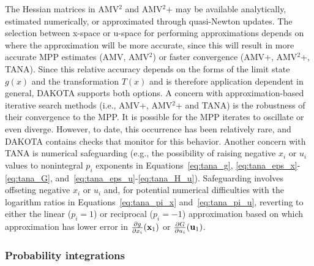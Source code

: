 The Hessian matrices in AMV$^2$ and AMV$^2$+ may be available
analytically, estimated numerically, or approximated through
quasi-Newton updates.  The selection between x-space or u-space for
performing approximations depends on where the approximation will be
more accurate, since this will result in more accurate MPP estimates
(AMV, AMV$^2$) or faster convergence (AMV+, AMV$^2$+, TANA).  Since
this relative accuracy depends on the forms of the limit state $g(x)$
and the transformation $T(x)$ and is therefore application dependent
in general, DAKOTA supports both options.  A concern with
approximation-based iterative search methods (i.e., AMV+, AMV$^2$+ and
TANA) is the robustness of their convergence to the MPP.  It is
possible for the MPP iterates to oscillate or even diverge.  However,
to date, this occurrence has been relatively rare, and DAKOTA contains
checks that monitor for this behavior.  Another concern with TANA is
numerical safeguarding (e.g., the possibility of raising negative
$x_i$ or $u_i$ values to nonintegral $p_i$ exponents in
Equations~\ref{eq:tana_g}, \ref{eq:tana_eps_x}-\ref{eq:tana_G},
and~\ref{eq:tana_eps_u}-\ref{eq:tana_H_u}).  Safeguarding involves
offseting negative $x_i$ or $u_i$ and, for potential numerical
difficulties with the logarithm ratios in Equations~\ref{eq:tana_pi_x}
and~\ref{eq:tana_pi_u}, reverting to either the linear ($p_i = 1$) or
reciprocal ($p_i = -1$) approximation based on which approximation has
lower error in $\frac{\partial g}{\partial x_i}({\bf x}_1)$ or
$\frac{\partial G}{\partial u_i}({\bf u}_1)$.

\subsubsection{Probability integrations} \label{uq:reliability:local:mpp:int}

